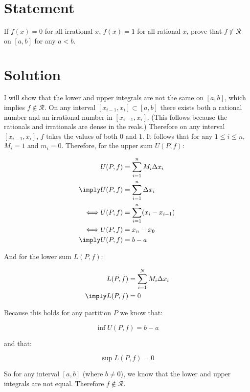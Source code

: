 \section{Statement} %

If $f(x) = 0$ for all irrational $x$, $f(x) = 1$ for all rational $x$, prove that $f\not\in\mathscr{R}$ on $[a,b]$ for any $a < b$.

\section{Solution}

I will show that the lower and upper integrals are not the same on $[a,b]$, which implies $f\not\in\mathscr{R}$.
On any interval $[x_{i-1},x_i]\subset[a,b]$ there exists both a rational number and an irrational number in $[x_{i-1},x_i]$.
(This follows because the rationals and irrationals are dense in the reals.)
Therefore on any interval $[x_{i-1},x_i]$, $f$ takes the values of both $0$ and $1$.
It follows that for any $1\leq i\leq n$, $M_i = 1$ and $m_i = 0$.
Therefore, for the upper sum $U(P,f)$:

\begin{align}
  & U(P,f) = \sum_{i=1}^{n}M_i \Delta x_i \\
  \imply & U(P,f) = \sum_{i=1}^{n} \Delta x_i \\
  \iff & U(P,f) = \sum_{i=1}^{n} (x_i - x_{i-1}) \\
  \iff & U(P,f) = x_n - x_0 \\
  \imply & U(P,f) = b - a \\
\end{align}

And for the lower sum $L(P,f)$:

\begin{align}
  & L(P,f) = \sum_{i=1}^{N} M_i \Delta x_i \\
  \imply & L(P,f) = 0
\end{align}

Because this holds for any partition $P$ we know that:

$$
\inf U(P,f) = b - a
$$

and that:

$$
\sup L(P,f) = 0
$$

So for any interval $[a,b]$ (where $b\neq 0$), we know that the lower and upper integrals are not equal.
Therefore $f\not\in\mathscr{R}$.

